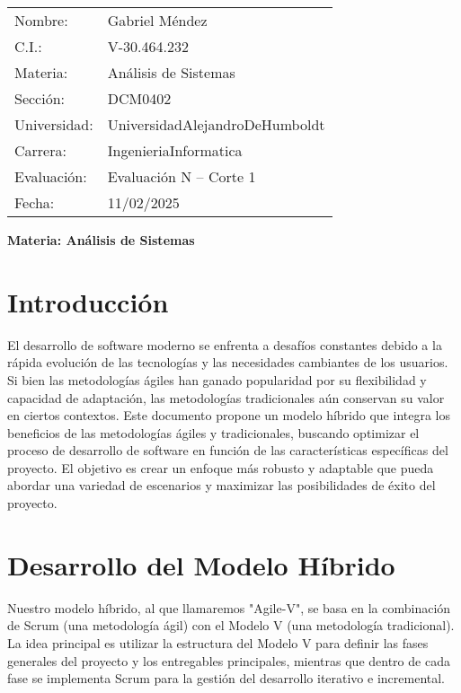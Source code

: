 \documentclass[12pt, spanish]{article}
\begin{document}
\begin{tabular}{ll}
Nombre: & Gabriel Méndez \\
C.I.: & V-30.464.232 \\
Materia: & Análisis de Sistemas \\
Sección: & DCM0402 \\
Universidad: & UniversidadAlejandroDeHumboldt \\
Carrera: & IngenieriaInformatica \\
Evaluación: & Evaluación N\textdegree1 – Corte 1 \\
Fecha: & 11/02/2025
\end{tabular}

\vspace{2cm}
\begin{center}
\Large \textbf{{Materia: Análisis de Sistemas}}
\end{center}

\section*{Introducción}

El desarrollo de software moderno se enfrenta a desafíos constantes debido a la rápida evolución de las tecnologías y las necesidades cambiantes de los usuarios. Si bien las metodologías ágiles han ganado popularidad por su flexibilidad y capacidad de adaptación, las metodologías tradicionales aún conservan su valor en ciertos contextos. Este documento propone un modelo híbrido que integra los beneficios de las metodologías ágiles y tradicionales, buscando optimizar el proceso de desarrollo de software en función de las características específicas del proyecto. El objetivo es crear un enfoque más robusto y adaptable que pueda abordar una variedad de escenarios y maximizar las posibilidades de éxito del proyecto.

\section*{Desarrollo del Modelo Híbrido}

Nuestro modelo híbrido, al que llamaremos "Agile-V", se basa en la combinación de Scrum (una metodología ágil) con el Modelo V (una metodología tradicional). La idea principal es utilizar la estructura del Modelo V para definir las fases generales del proyecto y los entregables principales, mientras que dentro de cada fase se implementa Scrum para la gestión del desarrollo iterativo e incremental.
\end{document}
